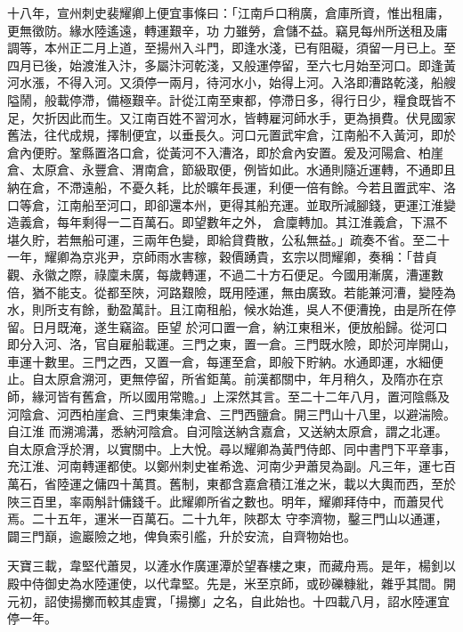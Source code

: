 \begin{pinyinscope}
 十八年，宣州刺史裴耀卿上便宜事條曰：「江南戶口稍廣，倉庫所資，惟出租庸，更無徵防。緣水陸遙遠，轉運艱辛，功
 力雖勞，倉儲不益。竊見每州所送租及庸調等，本州正二月上道，至揚州入斗門，即逢水淺，已有阻礙，須留一月已上。至四月已後，始渡淮入汴，多屬汴河乾淺，又般運停留，至六七月始至河口。即逢黃河水漲，不得入河。又須停一兩月，待河水小，始得上河。入洛即漕路乾淺，船艘隘鬧，般載停滯，備極艱辛。計從江南至東都，停滯日多，得行日少，糧食既皆不足，欠折因此而生。又江南百姓不習河水，皆轉雇河師水手，更為損費。伏見國家
 舊法，往代成規，擇制便宜，以垂長久。河口元置武牢倉，江南船不入黃河，即於倉內便貯。鞏縣置洛口倉，從黃河不入漕洛，即於倉內安置。爰及河陽倉、柏崖倉、太原倉、永豐倉、渭南倉，節級取便，例皆如此。水通則隨近運轉，不通即且納在倉，不滯遠船，不憂久耗，比於曠年長運，利便一倍有餘。今若且置武牢、洛口等倉，江南船至河口，即卻還本州，更得其船充運。並取所減腳錢，更運江淮變造義倉，每年剩得一二百萬石。即望數年之外，
 倉廩轉加。其江淮義倉，下濕不堪久貯，若無船可運，三兩年色變，即給貸費散，公私無益。」疏奏不省。至二十一年，耀卿為京兆尹，京師雨水害稼，穀價踴貴，玄宗以問耀卿，奏稱：「昔貞觀、永徽之際，祿廩未廣，每歲轉運，不過二十方石便足。今國用漸廣，漕運數倍，猶不能支。從都至陜，河路艱險，既用陸運，無由廣致。若能兼河漕，變陸為水，則所支有餘，動盈萬計。且江南租船，候水始進，吳人不便漕挽，由是所在停留。日月既淹，遂生竊盜。臣望
 於河口置一倉，納江東租米，便放船歸。從河口即分入河、洛，官自雇船載運。三門之東，置一倉。三門既水險，即於河岸開山，車運十數里。三門之西，又置一倉，每運至倉，即般下貯納。水通即運，水細便止。自太原倉溯河，更無停留，所省鉅萬。前漢都關中，年月稍久，及隋亦在京師，緣河皆有舊倉，所以國用常贍。」上深然其言。至二十二年八月，置河陰縣及河陰倉、河西柏崖倉、三門東集津倉、三門西鹽倉。開三門山十八里，以避湍險。自江淮
 而溯鴻溝，悉納河陰倉。自河陰送納含嘉倉，又送納太原倉，謂之北運。自太原倉浮於渭，以實關中。上大悅。尋以耀卿為黃門侍郎、同中書門下平章事，充江淮、河南轉運都使。以鄭州刺史崔希逸、河南少尹蕭炅為副。凡三年，運七百萬石，省陸運之傭四十萬貫。舊制，東都含嘉倉積江淮之米，載以大輿而西，至於陜三百里，率兩斛計傭錢千。此耀卿所省之數也。明年，耀卿拜侍中，而蕭炅代焉。二十五年，運米一百萬石。二十九年，陜郡太
 守李濟物，鑿三門山以通運，闢三門巔，逾巖險之地，俾負索引艦，升於安流，自齊物始也。



 天寶三載，韋堅代蕭炅，以滻水作廣運潭於望春樓之東，而藏舟焉。是年，楊釗以殿中侍御史為水陸運使，以代韋堅。先是，米至京師，或砂礫糠紕，雜乎其間。開元初，詔使揚擲而較其虛實，「揚擲」之名，自此始也。十四載八月，詔水陸運宜停一年。




\end{pinyinscope}
